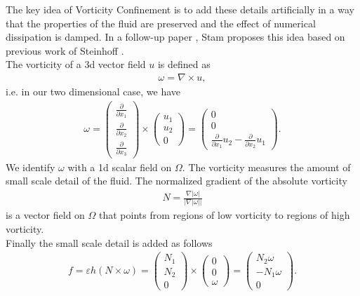 \documentclass[a4paper,10pt,oneside,final,german,openbib,pdftex,titlepage]{scrbook}
\begin{document}
The key idea of Vorticity Confinement is to add these details artificially in a way that the properties of the fluid are preserved and the effect of numerical dissipation is damped. In a follow-up paper \cite{Stam2}, Stam proposes this idea based on previous work of Steinhoff \cite{Steinhoff}.\\

The vorticity of a 3d vector field $u$ is defined as
\begin{align*}
	\omega = \nabla \times u,
\end{align*}
i.e. in our two dimensional case, we have
\begin{align*}
	\omega = \left( \begin{matrix}
	\frac{\partial}{\partial x_1} \\ \frac{\partial}{\partial x_2} \\ \frac{\partial}{\partial x_3}
	\end{matrix} \right) \times 
	\left( \begin{matrix}
	u_1 \\ u_2 \\ 0
	\end{matrix} \right) = \left( \begin{matrix}
	 0\\ 0 \\ \frac{\partial}{\partial x_1} u_2 - \frac{\partial}{\partial x_2} u_1 
	\end{matrix} \right).
\end{align*}
We identify $\omega$ with a 1d scalar field on $\Omega$. The vorticity measures the amount of small scale detail of the fluid. The normalized gradient of the absolute vorticity
\begin{align*}
	N = \frac{\nabla |\omega |}{|\nabla  |\omega ||}
\end{align*}
is a vector field on $\Omega$ that points from regions of low vorticity to regions of high vorticity.\\
Finally the small scale detail is added as follows
\begin{align}
	f = \varepsilon h (N\times \omega ) = \left( \begin{matrix}
	N_1\\ N_2 \\0
	\end{matrix}  \right) \times \left( \begin{matrix} 0\\ 0\\ \omega \end{matrix} \right) = \left( \begin{matrix}
	N_2 \omega \\ -N_1 \omega \\ 0
	\end{matrix} \right). \label{VorticityConfinement}
\end{align}
\end{document}
